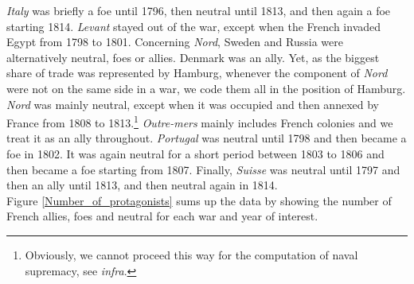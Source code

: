 \documentclass[12pt,a4paper,notitlepage,english]{article}
\begin{document}
\begin{appendix}
\textit{Italy} was briefly a foe until 1796, then neutral until 1813, and then again a foe starting 1814.
\textit{Levant} stayed out of the war, except when the French invaded Egypt from 1798 to 1801.
Concerning \textit{Nord}, Sweden and Russia were alternatively neutral, foes or allies. Denmark was an ally. Yet, as the biggest share of trade was represented by Hamburg, whenever the component of \textit{Nord} were not on the same side in a war, we code them all in the position of Hamburg. \textit{Nord} was mainly neutral, except when it was occupied and then annexed by France from 1808 to 1813.\footnote{Obviously, we cannot proceed this way for the computation of naval supremacy, see \textit{infra}.}
\textit{Outre-mers} mainly includes French colonies and we treat it as an ally throughout.
\textit{Portugal} was neutral until 1798 and then became a foe in 1802.
It was again neutral for a short period between 1803 to 1806 and then became a foe starting from 1807.
Finally, \textit{Suisse} was neutral until 1797 and then an ally until 1813, and then neutral again in 1814. \\
Figure \ref{Number_of_protagonists} sums up the data by showing the number of French allies, foes and neutral for each war and year of interest. 


\end{appendix}
\end{document}
